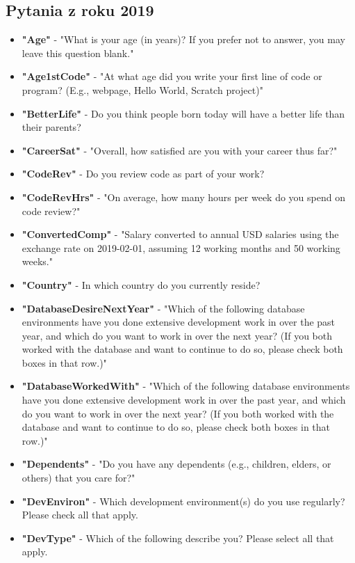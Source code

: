\begin{appendices}
    \section{Pytania z roku 2019}\label{pytania-2019}


    \begin{itemize}
        \item \textbf{"Age"} - "What is your age (in years)? If you prefer not to answer, you may leave this question blank."
        \item \textbf{"Age1stCode"} - "At what age did you write your first line of code or program? (E.g., webpage, Hello World, Scratch project)"
        \item \textbf{"BetterLife"} - Do you think people born today will have a better life than their parents?
        \item \textbf{"CareerSat"} - "Overall, how satisfied are you with your career thus far?"
        \item \textbf{"CodeRev"} - Do you review code as part of your work?
        \item \textbf{"CodeRevHrs"} - "On average, how many hours per week do you spend on code review?"
        \item \textbf{"ConvertedComp"} - "Salary converted to annual USD salaries using the exchange rate on 2019-02-01, assuming 12 working months and 50 working weeks."
        \item \textbf{"Country"} - In which country do you currently reside?
        \item \textbf{"DatabaseDesireNextYear"} - "Which of the following database environments have you done extensive development work in over the past year, and which do you want to work in over the next year?   (If you both worked with the database and want to continue to do so, please check both boxes in that row.)"
        \item \textbf{"DatabaseWorkedWith"} - "Which of the following database environments have you done extensive development work in over the past year, and which do you want to work in over the next year?   (If you both worked with the database and want to continue to do so, please check both boxes in that row.)"
        \item \textbf{"Dependents"} - "Do you have any dependents (e.g., children, elders, or others) that you care for?"
        \item \textbf{"DevEnviron"} - Which development environment(s) do you use regularly? Please check all that apply.
        \item \textbf{"DevType"} - Which of the following describe you? Please select all that apply.

\end{itemize}
\end{appendices}
